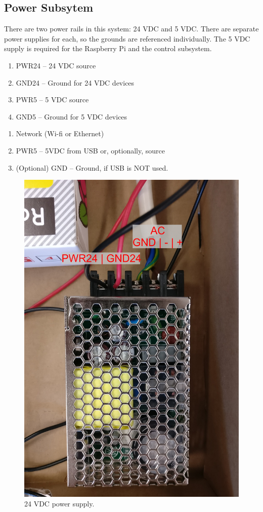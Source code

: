 \documentclass[twoside,a4paper]{refart}
\begin{document}
\subsection{Power Subsytem}
There are two power rails in this system: 24 VDC and 5 VDC. There are separate power supplies for each, so the grounds are referenced individually. The 5 VDC supply is required for the Raspberry Pi and the control subsystem.
\begin{enumerate}
	\item  {} PWR24 -- 24 VDC source
	\item GND24 -- Ground for 24 VDC devices
	\item PWR5 -- 5 VDC source
	\item GND5 -- Ground for 5 VDC devices
\end{enumerate}
\begin{enumerate}
	\item  {} Network (Wi-fi or Ethernet)
	\item PWR5 -- 5VDC from USB or, optionally, source
	\item (Optional) GND -- Ground, if USB is NOT used. 
\end{enumerate}

\begin{figure}[H]
	\centering
	\includegraphics[width=0.7\linewidth]{ph_power24}
	\caption{24 VDC power supply.}
	\label{fig:ph_power24}
\end{figure}
\end{document}
